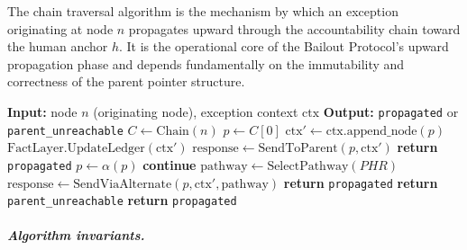 The chain traversal algorithm is the mechanism by which an exception originating at node $n$ propagates upward through the accountability chain toward the human anchor $h$. It is the operational core of the Bailout Protocol's upward propagation phase and depends fundamentally on the immutability and correctness of the parent pointer structure.

\begin{algorithm}[htbp]
\caption{ChainTraversal — upward exception propagation}
\label{alg:chain-traversal}
\begin{algorithmic}[1]
\State \textbf{Input:} node $n$ (originating node), exception context $\text{ctx}$
\State \textbf{Output:} \texttt{propagated} or \texttt{parent\_unreachable}
\State
\State $C \leftarrow \text{Chain}(n)$ 
\State $p \leftarrow C[0]$ 
\State
{}
    \State $\text{ctx}' \leftarrow \text{ctx}.\text{append\_node}(p)$ 
    \State $\text{FactLayer.UpdateLedger}(\text{ctx}')$ 
    \State $\text{response} \leftarrow \text{SendToParent}(p, \text{ctx}')$ 
    \State
        \State \textbf{return} \texttt{propagated} 
        \State $p \leftarrow \alpha(p)$ 
        \State \textbf{continue}
    \Else {}
        \State $\text{pathway} \leftarrow \text{SelectPathway}(PHR)$ 
        \State $\text{response} \leftarrow \text{SendViaAlternate}(p, \text{ctx}', \text{pathway})$
        \State {} \State \textbf{return} \texttt{propagated}
         \State \textbf{return} \texttt{parent\_unreachable}
        \EndIf
    \EndIf
\EndWhile
\State \textbf{return} \texttt{propagated} 
\end{algorithmic}
\end{algorithm}

\subparagraph{Algorithm invariants.}

